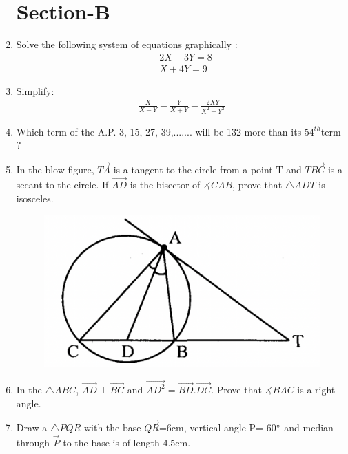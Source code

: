 \documentclass[journal,12pt,twocolumn]{IEEEtran}
\begin{document}
\begin{enumerate}
\section{Section-B}
\item Solve the following system of equations graphically :
\begin{align}
&2X+3Y=8\nonumber \\ &X+4Y=9 \nonumber
\end{align}

\item Simplify:
\begin{align}
\displaystyle\frac{X}{X-Y}-\displaystyle\frac{Y}{X+Y}-\displaystyle\frac{2XY}{X^2-Y^2} \nonumber
\end{align}

\item Which term of the A.P. 3, 15, 27, 39,....... will be 132 more than its $54^{th} $term ?

\item In the blow figure, $\vec{TA}$ is a tangent to the circle from a point T and $\vec{TBC}$ is a secant to the circle. If $\vec{AD}$ is the bisector of $\measuredangle{CAB} $, prove that $\triangle{ADT} $ is isosceles.
\begin{figure}[h!]
    \centering
    \includegraphics[width=\columnwidth]{6.png}
    \caption{}
 \end{figure}
 
 \item In  the $\triangle{ABC}$, $\vec{AD} \perp \vec{BC}$ and $\vec{AD^2}= \vec{BD}.\vec{DC}$.  Prove that $\measuredangle{BAC}$ is a right angle.
  
 \item Draw a $\triangle{PQR}$ with the base $\vec{QR}$=6cm, vertical angle P= 60$\degree$ and median through $\vec{P}$ to the base is of length 4.5cm.
 

\end{enumerate}
\end{document}
